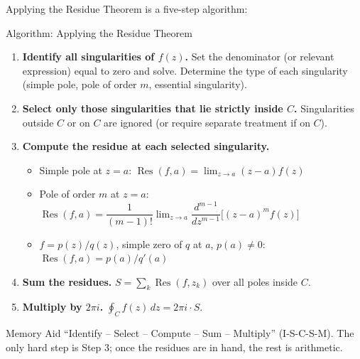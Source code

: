 \documentclass[12pt,a4paper]{article}
\begin{document}
Applying the Residue Theorem is a five-step algorithm:

\begin{infobox}{Algorithm: Applying the Residue Theorem}
\begin{enumerate}[label=\textbf{Step \arabic*.}, leftmargin=*, noitemsep]
  \item \textbf{Identify all singularities of $f(z)$.}
        Set the denominator (or relevant expression) equal to zero and solve.
        Determine the type of each singularity (simple pole, pole of order $m$,
        essential singularity).

  \item \textbf{Select only those singularities that lie strictly inside $C$.}
        Singularities outside $C$ or on $C$ are ignored (or require separate
        treatment if on $C$).

  \item \textbf{Compute the residue at each selected singularity.}
        \begin{itemize}[noitemsep]
          \item Simple pole at $z = a$:
                $\operatorname{Res}(f,a) = \lim_{z\to a}(z-a)f(z)$
          \item Pole of order $m$ at $z = a$:
                $\operatorname{Res}(f,a) =
                  \dfrac{1}{(m-1)!}\lim_{z\to a}
                  \dfrac{d^{m-1}}{dz^{m-1}}\bigl[(z-a)^m f(z)\bigr]$
          \item $f = p(z)/q(z)$, simple zero of $q$ at $a$, $p(a)\neq 0$:
                $\operatorname{Res}(f,a) = p(a)/q'(a)$
        \end{itemize}

  \item \textbf{Sum the residues.}
        $S = \sum_{k} \operatorname{Res}(f, z_k)$ over all poles inside $C$.

  \item \textbf{Multiply by $2\pi i$.}
        $\oint_{C} f(z)\,dz = 2\pi i \cdot S$.
\end{enumerate}
\end{infobox}

\begin{learnbox}{Memory Aid}
``Identify -- Select -- Compute -- Sum -- Multiply'' (I-S-C-S-M). The only
hard step is Step 3; once the residues are in hand, the rest is arithmetic.
\end{learnbox}

\end{document}
